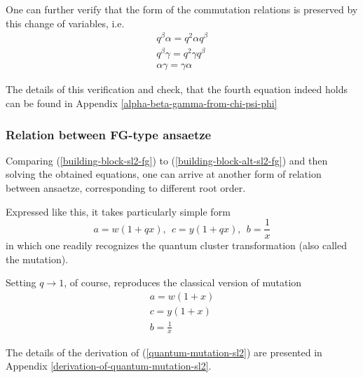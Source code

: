 \documentclass{article}
\newcommand{\lb}{\left (}
\newcommand{\rb}{\right )}
\newcommand{\be}{\begin{eqnarray}}
\newcommand{\ee}{\end{eqnarray}}
\newcommand {\?}{\textit{???}}
\def\classlim{q \rightarrow 1}
\newcommand{\delabel}[1]{(\ref{#1})}
\begin{document}
One can further verify that the form of the commutation relations is preserved by this change of variables, i.e.
\be
q^{\beta} \alpha = q^2 \alpha q^{\beta} \\
q^{\beta} \gamma = q^2 \gamma q^{\beta} \\
\alpha \gamma = \gamma \alpha
\ee

The details of this verification and check, that the fourth equation indeed holds
can be found in Appendix \ref{alpha-beta-gamma-from-chi-psi-phi}

\subsubsection{Relation between FG-type ansaetze}
Comparing \delabel{building-block-sl2-fg} to \delabel{building-block-alt-sl2-fg} and then
solving the obtained equations, one can arrive at another form of relation between
ansaetze, corresponding to different root order.

Expressed like this, it takes particularly simple form
\begin{equation}
\label{quantum-mutation-sl2}
  \boxed{
    a = w (1 + q x),\ \ c = y(1 + q x), \ \ b = \frac{1}{x}
  }
\end{equation}
in which one readily recognizes the quantum cluster transformation (also called the mutation).

Setting $\classlim$, of course, reproduces the classical version of mutation
\be
\label{classical-mutation-sl2}
a = w \lb 1 + x\rb \\
c = y \lb 1 + x\rb \\
b = \frac{1}{x}
\ee

The details of the derivation of \delabel{quantum-mutation-sl2} are presented in Appendix
\ref{derivation-of-quantum-mutation-sl2}.


\end{document}

